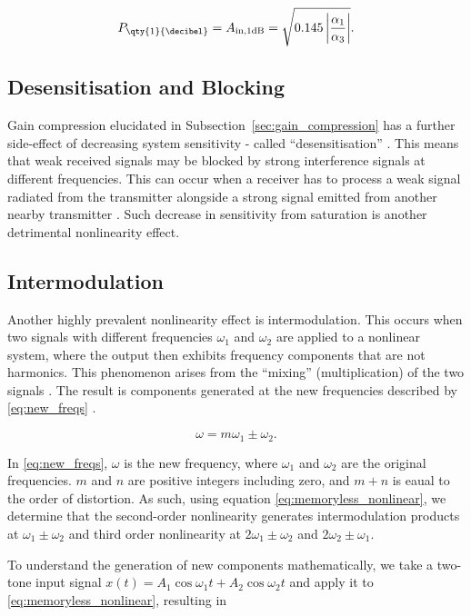 \begin{equation}
  P_{\text{\qty{1}{\decibel}}} = A_{\text{in,1dB}} = \sqrt{0.145\left|\frac{\alpha_1}{\alpha_3}\right|} .
  \label{eq:1db_point}
\end{equation}

\subsection{Desensitisation and Blocking}

Gain compression elucidated in Subsection~\ref{sec:gain_compression} has a further side-effect of decreasing system sensitivity - called ``desensitisation'' \cite{maas}. This means that weak received signals may be blocked by strong interference signals at different frequencies. This can occur when a receiver has to process a weak signal radiated from the transmitter alongside a strong signal emitted from another nearby transmitter \cite{wambacq}. Such decrease in sensitivity from saturation is another detrimental nonlinearity effect.   

\subsection{Intermodulation}

Another highly prevalent nonlinearity effect is intermodulation. This occurs when two signals with different frequencies $\omega_1$ and $\omega_2$ are applied to a nonlinear system, where the output then exhibits frequency components that are not harmonics. This phenomenon arises from the ``mixing'' (multiplication) of the two signals \cite{razavi}. The result is components generated at the new frequencies described by \eqref{eq:new_freqs} \cite{lee}.

\begin{equation}
  \omega = m\omega_1 \pm \omega_2.
  \label{eq:new_freqs}
\end{equation}

In \eqref{eq:new_freqs}, $\omega$ is the new frequency, where $\omega_1$ and $\omega_2$ are the original frequencies. $m$ and $n$ are positive integers including zero, and $m + n$ is eaual to the order of distortion. As such, using equation \eqref{eq:memoryless_nonlinear}, we determine that the second-order nonlinearity generates intermodulation products at $\omega_1 \pm \omega_2$ and third order nonlinearity at $2\omega_1 \pm \omega_2$ and $2\omega_2 \pm \omega_1$.

To understand the generation of new components mathematically, we take a two-tone input signal $x(t) = A_1\cos \omega_1 t + A_2\cos \omega_2 t$ and apply it to \eqref{eq:memoryless_nonlinear}, resulting in

